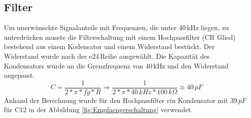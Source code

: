 \subsection{Filter}%
Um unerwünschte Signalanteile mit Frequenzen, die unter 40\,kHz liegen, zu unterdrücken musste die Filterschaltung mit einem Hochpassfilter (CR Glied) bestehend aus einem Kodensator und einem Widerstand bestückt. Der Widerstand wurde nach der e24\,Reihe ausgewählt.
Die Kapazität des Kondensators wurde an die Grenzfrequenz von 40\,kHz und den Widerstand angepasst.
\onehalfspacing \\
\[\displaystyle C=\frac{1}{2*\pi*fg*R}\Rightarrow\frac{1}{2*\pi*40\,kHz*100\,k\Omega}\approx40\,pF \]
\singlespacing
Anhand der Berechnung wurde für den Hochpassfilter ein Kondensator mit \(\displaystyle 39\,pF\) für C12 in der Abbildung \ref{fig:Empfaengerschaltung} verwendet.
\newpage
